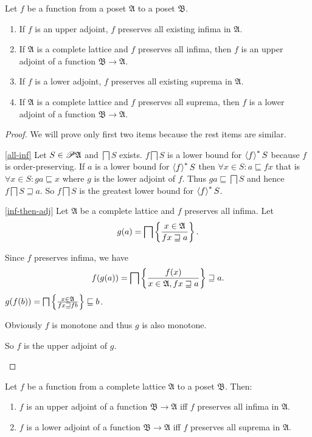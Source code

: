 \begin{thm}
Let $f$ be a function from a poset $\mathfrak{A}$ to a poset $\mathfrak{B}$.
\begin{enumerate}
\item \label{all-inf}If $f$ is an upper adjoint, $f$ preserves all existing
infima in $\mathfrak{A}$.
\item \label{inf-then-adj}If $\mathfrak{A}$ is a complete lattice and
$f$ preserves all infima, then $f$ is an upper adjoint of a function
$\mathfrak{B}\rightarrow\mathfrak{A}$.
\item If $f$ is a lower adjoint, $f$ preserves all existing suprema in
$\mathfrak{A}$.
\item If $\mathfrak{A}$ is a complete lattice and $f$ preserves all suprema,
then $f$ is a lower adjoint of a function $\mathfrak{B}\rightarrow\mathfrak{A}$.
\end{enumerate}
\end{thm}
\begin{proof}
We will prove only first two items because the rest items are similar.
\begin{widedisorder}
\item [{\ref{all-inf}}] Let $S\in\mathscr{P}\mathfrak{A}$ and $\bigsqcap S$
exists. $f\bigsqcap S$ is a lower bound for $\left\langle f\right\rangle ^{\ast}S$ because
$f$ is order-preserving. If $a$ is a lower bound for $\left\langle f\right\rangle ^{\ast}S$
then $\forall x\in S:a\sqsubseteq fx$ that is $\forall x\in S:ga\sqsubseteq x$
where $g$ is the lower adjoint of $f$. Thus $ga\sqsubseteq\bigsqcap S$
and hence $f\bigsqcap S\sqsupseteq a$. So $f\bigsqcap S$ is the
greatest lower bound for $\left\langle f\right\rangle ^{\ast}S$.
\item [{\ref{inf-then-adj}}] Let $\mathfrak{A}$ be a complete lattice
and $f$ preserves all infima. Let
\[
g(a)=\bigsqcap\left\{ \frac{x\in\mathfrak{A}}{fx\sqsupseteq a}\right\}.
\]



Since $f$ preserves infima, we have
\[
f(g(a))=\bigsqcap\left\{ \frac{f(x)}{x\in\mathfrak{A},fx\sqsupseteq a}\right\}\sqsupseteq a.
\]
$g(f(b))=\bigsqcap\left\{ \frac{x\in\mathfrak{A}}{fx\sqsupseteq fb}\right\}\sqsubseteq b$.


Obviously $f$ is monotone and thus $g$ is also monotone.


So $f$ is the upper adjoint of $g$.

\end{widedisorder}
\end{proof}
\begin{cor}
Let $f$ be a function from a complete lattice $\mathfrak{A}$ to
a poset $\mathfrak{B}$. Then:
\begin{enumerate}
\item $f$ is an upper adjoint of a function $\mathfrak{B}\rightarrow\mathfrak{A}$
iff $f$ preserves all infima in $\mathfrak{A}$.
\item $f$ is a lower adjoint of a function $\mathfrak{B}\rightarrow\mathfrak{A}$
iff $f$ preserves all suprema in $\mathfrak{A}$.
\end{enumerate}
\end{cor}

